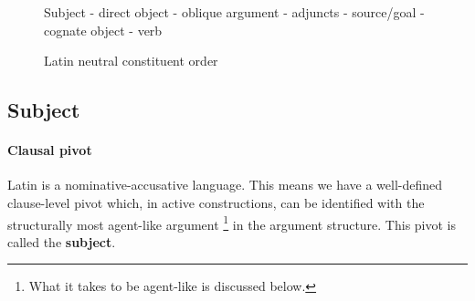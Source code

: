 \documentclass[a4paper, oneside, 12pt]{report}
\newcommand*{\concept}[1]{\textbf{#1}}
\begin{document}
\begin{figure}[H]
    \centering
    Subject - direct object - oblique argument - adjuncts - source/goal - cognate object - verb
    \caption{Latin neutral constituent order}
    \label{fig:latin-neutral-clause}
\end{figure}

\subsection{Subject}\label{sec:grammatical.clause.subject} 

\paragraph*{Clausal pivot}
Latin is a nominative-accusative language.
This means we have a well-defined clause-level pivot 
which, in active constructions,
can be identified with the structurally most agent-like argument%
\footnote{
    What it takes to be agent-like is discussed below.
}
in the argument structure.
This pivot is called the \concept{subject}.
\end{document}
